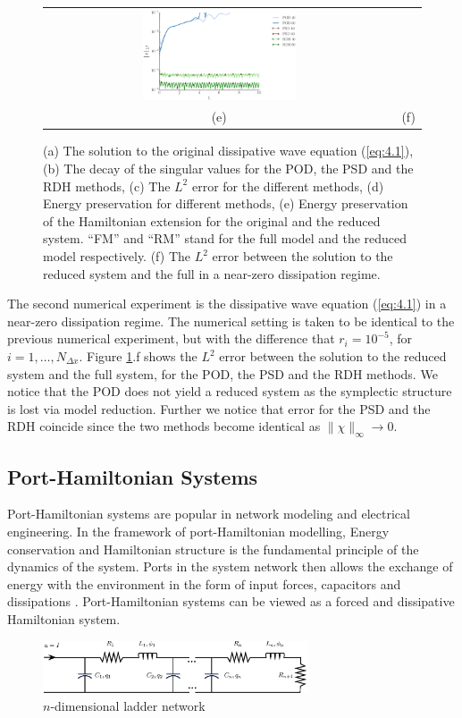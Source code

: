 \begin{figure}[t]
\begin{tabular}{cc}
\includegraphics[width=0.45\textwidth]{./figs/wave/error_homo} \\
(e) & (f) 
\end{tabular}
\caption{(a) The solution to the original dissipative wave equation (\ref{eq:4.1}), (b) The decay of the singular values for the POD, the PSD and the RDH methods, (c) The $L^2$ error for the different methods, (d) Energy preservation for different methods, (e) Energy preservation of the Hamiltonian extension for the original and the reduced system. ``FM'' and ``RM'' stand for the full model and the reduced model respectively. (f) The $L^2$ error between the solution to the reduced system and the full in a near-zero dissipation regime.} \label{fig:4.1}
\end{figure}

The second numerical experiment is the dissipative wave equation (\ref{eq:4.1}) in a near-zero dissipation regime. The numerical setting is taken to be identical to the previous numerical experiment, but with the difference that $r_i = 10^{-5}$, for $i=1,\dots,N_{\Delta x}$. Figure \ref{fig:4.1}.f shows the $L^2$ error between the solution to the reduced system and the full system, for the POD, the PSD and the RDH methods. We notice that the POD does not yield a reduced system as the symplectic structure is lost via model reduction. Further we notice that error for the PSD and the RDH coincide since the two methods become identical as $\| \chi \|_{\infty}\to 0$.

\subsection{Port-Hamiltonian Systems}
Port-Hamiltonian systems are popular in network modeling and electrical engineering. In the framework of port-Hamiltonian modelling, Energy conservation and Hamiltonian structure is the fundamental principle of the dynamics of the system. Ports in the system network then allows the exchange of energy with the environment in the form of input forces, capacitors and dissipations \cite{vanderSchaft:2014:PST:2693645.2693646}. Port-Hamiltonian systems can be viewed as a forced and dissipative Hamiltonian system.
\begin{figure}[t]
\begin{center}
	\includegraphics[width=0.7\textwidth]{./figs/porthamil/circuit}
\end{center}
\caption{$n$-dimensional ladder network} \label{fig:4.2}
\end{figure}

